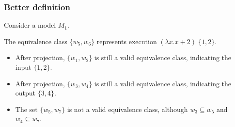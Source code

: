 \begin{frame}[fragile]
    \frametitle{Better definition}

Consider a model $M_1$.

    
The equivalence class $\{w_5, w_6\}$ represents execution $(\lambda x.x+2)\;\{1,2\}$.
\begin{itemize}
    \item After projection, $\{w_1, w_2\}$ is still a valid equivalence class, indicating the input $\{1,2\}$.
    \item After projection, $\{w_3, w_4\}$ is still a valid equivalence class, indicating the output $\{3,4\}$.
    \item The set $\{w_5, w_7\}$ is not a valid equivalence class, although $w_3 \subseteq w_5$ and $w_4 \subseteq w_7$.
\end{itemize}

\end{frame}

